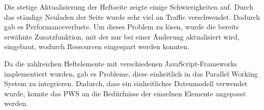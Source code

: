 \newpage

Die stetige Aktualisierung der Heftseite zeigte einige Schwierigkeiten auf. Durch das ständige Neuladen der Seite wurde sehr viel an Traffic verschwendet. Dadurch gab es Performanceverluste. Um dieses Problem zu lösen, wurde die bereits erwähnte Zusatzfunktion, mit der nur bei einer Änderung aktualisiert wird, eingebaut, wodurch Ressourcen eingespart werden konnten.

Da die zahlreichen Heftelemente mit verschiedenen JavaScript-Frameworks implementiert wurden, gab es Probleme, diese einheitlich in das Parallel Working System zu integrieren. Dadurch, dass ein einheitliches Datenmodell verwendet wurde, konnte das PWS an die Bedürfnisse der einzelnen Elemente angepasst werden. 